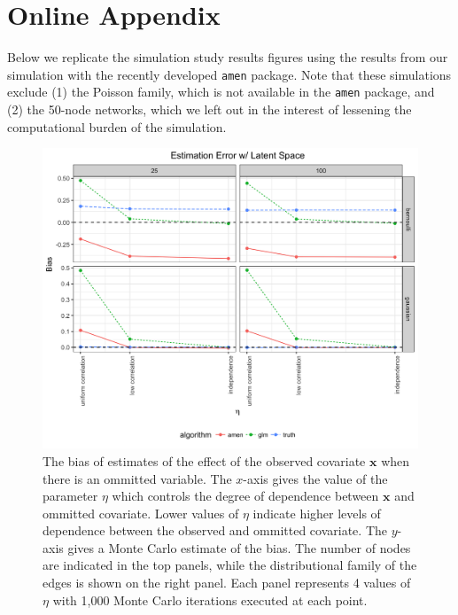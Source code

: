 \documentclass[11pt]{article}
\begin{document}
\newpage




\newpage
\section*{Online Appendix}
Below we replicate the simulation study results figures using the results from our simulation with the recently developed \texttt{amen} package. Note that these simulations exclude (1) the Poisson family, which is not available in the \texttt{amen} package, and (2) the 50-node networks, which we left out in the interest of lessening the computational burden of the simulation.

\begin{figure}
\includegraphics[width=\textwidth]{figures/estimation_ls_amen.png}
\caption{The bias of estimates of the effect of the observed covariate $\mathbf{x}$ when there is an ommitted variable. The $x$-axis gives the value of the parameter $\eta$ which controls the degree of dependence between $\mathbf{x}$ and ommitted covariate. Lower values of $\eta$ indicate higher levels of dependence between the observed and ommitted covariate. The $y$-axis gives a Monte Carlo estimate of the bias. The number of nodes are indicated in the top panels, while the distributional family of the edges is shown on the right panel. Each panel represents 4 values of $\eta$ with 1,000 Monte Carlo iterations executed at each point.
\label{fig:estimation_ls_amen}}
\end{figure}
\end{document}
